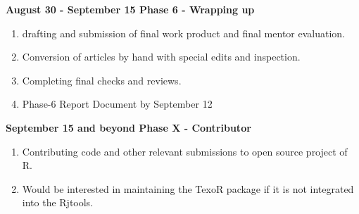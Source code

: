 \documentclass[12pt]{article}
\begin{document}
{\large\bfseries {\color{orange}August 30 - September 15} Phase 6 - Wrapping up}
\begin{enumerate}[label = {  \color{MediumBlue} \textbf{\arabic*. }},align=left]
\item drafting and submission of final work product and  final mentor evaluation.
\item Conversion of articles by hand with special edits and inspection.
\item Completing final checks and reviews.
\item Phase-6 Report Document by September 12
\end{enumerate}
{\large\bfseries {\color{orange}September 15 and beyond } Phase X - Contributor}
\begin{enumerate}[label = {  \color{MediumBlue} \textbf{\arabic*. }},align=left]
\item Contributing code and other relevant submissions to open source project of R.
\item Would be interested in maintaining the TexoR package if it is not integrated into the Rjtools.
\end{enumerate}
\end{document}
